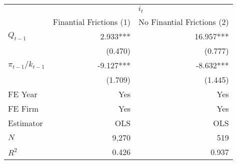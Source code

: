 \begin{tabular}{lrr}
\toprule
                      &               \multicolumn{2}{c}{$i_{t}$}               \\ 
\cmidrule(lr){2-3} 
                      & Finantial Frictions (1) & No Finantial Frictions (2) \\ 
\midrule
$Q_{t-1}$             &                2.933*** &                    16.957*** \\ 
                      &                 (0.470) &                      (0.777) \\ 
$\pi_{t-1} / k_{t-1}$ &               -9.127*** &                    -8.632*** \\ 
                      &                 (1.709) &                      (1.445) \\ 
\midrule
FE Year               &                     Yes &                          Yes \\ 
FE Firm               &                     Yes &                          Yes \\ 
\midrule
Estimator             &                     OLS &                          OLS \\ 
\midrule
$N$                   &                   9,270 &                          519 \\ 
$R^2$                 &                   0.426 &                        0.937 \\ 
\bottomrule
\end{tabular}
